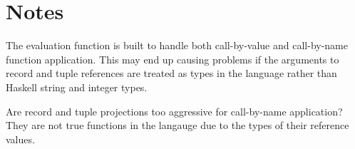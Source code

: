 \documentclass[10pt]{article}
\begin{document}
\section{Notes}

The evaluation function is built to handle both call-by-value and
call-by-name function application.  This may end up causing problems
if the arguments to record and tuple references are treated as types
in the language rather than Haskell string and integer types.

Are record and tuple projections too aggressive for call-by-name
application?  They are not true functions in the langauge due to the
types of their reference values.


\end{document}
